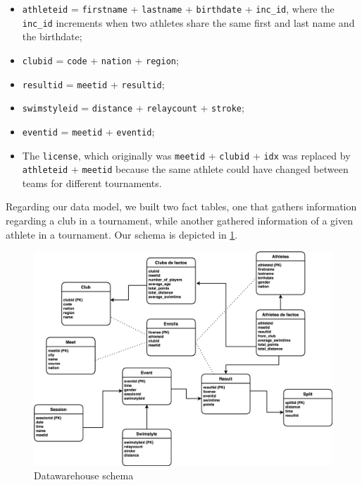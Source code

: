 \documentclass[a4paper, 11pt]{article}
\begin{document}
\begin{itemize}
    \item \texttt{athleteid} = \texttt{firstname} + \texttt{lastname} + \texttt{birthdate} + \texttt{inc\_id}, where the
    \texttt{inc\_id} increments when two athletes share the same first and last name and the birthdate;
    \item \texttt{clubid} = \texttt{code} + \texttt{nation} + \texttt{region};
    \item \texttt{resultid} = \texttt{meetid} + \texttt{resultid};
    \item \texttt{swimstyleid} = \texttt{distance} + \texttt{relaycount} + \texttt{stroke};
    \item \texttt{eventid} = \texttt{meetid} + \texttt{eventid};
    \item The \texttt{license}, which originally was \texttt{meetid} + \texttt{clubid} + \texttt{idx} was replaced by
    \texttt{athleteid} + \texttt{meetid} because the same athlete could have changed between teams for different
    tournaments.
\end{itemize}

Regarding our data model, we built two fact tables, one that gathers information regarding a club in a tournament, while
another gathered information of a given athlete in a tournament.
Our schema is depicted in \cref{fig:defact}.

\begin{figure}[H]
    \centering
    \includegraphics[width=\textwidth]{img/datawarehouse.png}
    \caption{Datawarehouse schema}
    \label{fig:defact}
\end{figure}
\end{document}
